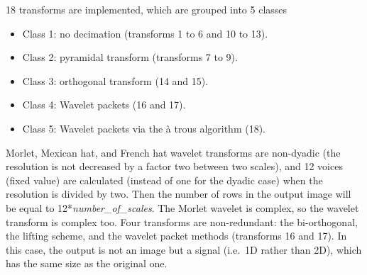 \documentclass[11pt,a4paper]{article}
\begin{document}
 18 transforms are implemented, which are grouped into 5 classes 
\begin{itemize}
\item{Class 1:} no decimation (transforms 1 to 6 and 10 to 13).
\item{Class 2:} pyramidal transform (transforms 7 to 9).
\item{Class 3:} orthogonal transform (14 and 15).
\item{Class 4:} Wavelet packets (16 and 17).
\item{Class 5:} Wavelet packets via the \`a trous algorithm  (18).
\end{itemize}

Morlet, Mexican hat,
and French hat wavelet transforms are non-dyadic (the resolution is
not decreased by a factor two between two scales), 
and 12 voices (fixed value) are calculated (instead of one for the
dyadic case) when the resolution is divided by two. Then the number of 
rows in the output image will be equal to 12*{\em number\_of\_scales}.
The Morlet wavelet is complex, so the wavelet transform is complex too.
Four transforms are non-redundant: the bi-orthogonal,
the lifting scheme, and the wavelet packet methods (transforms 16 and 17). 
In this case, the output is not an 
image but a signal (i.e.\ 1D rather than 2D), 
which has the same size as the original one.
 
\end{document}
